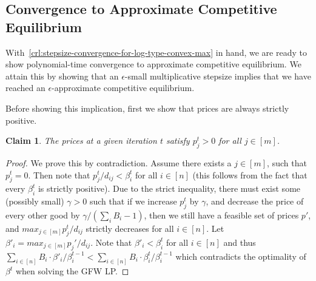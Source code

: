 \documentclass[format=acmsmall,authorversion]{acmart}
\newtheorem{claim}[theorem]{Claim}
\newcommand{\ck}[1]{{\textcolor{red}{CK: #1}}}
\newcommand{\ntl}[1]{{\textcolor{teal}{Tianlong: #1}}}
\begin{document}
\subsection{Convergence to Approximate Competitive Equilibrium}


With~\cref{crl:stepsize-convergence-for-log-type-convex-max} in hand, we are ready to show polynomial-time convergence to approximate competitive equilibrium. We attain this by showing that an $\epsilon$-small multiplicative stepsize implies that we have reached an $\epsilon$-approximate competitive equilibrium. 

Before showing this implication, first we show that prices are always strictly positive.
\begin{claim}
    The prices at a given iteration $t$ satisfy $p^t_j > 0$ for all $j \in [m]$. 
    \label{claim:all-price-strictly-positive}
\end{claim} 
\begin{proof}
    We prove this by contradiction. Assume there exists a $j \in [m]$, such that $p^t_j = 0$. Then note that $p^t_j/d_{i j} < \beta^t_{i}$ for all $i \in [n]$ (this follows from the fact that every $\beta^t_i$ is strictly positive). 
    Due to the strict inequality, there must exist some (possibly small) $\gamma>0$ such that if we increase $p_j^t$ by $\gamma$, and decrease the price of every other good by $\gamma / (\sum_i B_i -1)$, then we still have a feasible set of prices $p'$, and $\mathit{max}_{j \in [m]} p^t_j/d_{ij}$ strictly decreases for all $i \in [n]$.
    Let $\beta'_i = \mathit{max}_{j \in [m]} p_j'/d_{ij}$. Note that $\beta'_i < \beta^t_i$ for all $i \in [n]$ and thus $\sum_{i \in [n]} B_i \cdot \beta'_i/\beta^{t-1}_i <\sum_{i\in [n]} B_i \cdot \beta^t_i/\beta^{t-1}_i$ which contradicts the optimality of $\beta^t$ when solving the GFW LP.
\end{proof}
\end{document}
